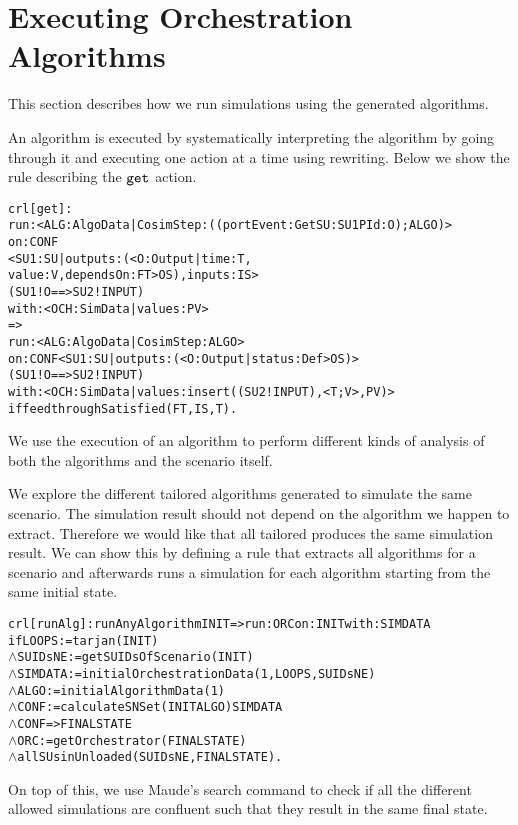 
\section{Executing Orchestration Algorithms}
This section describes how we run simulations using the generated algorithms.

An algorithm is executed by systematically interpreting the algorithm by going through it and executing one action at a time using rewriting.
Below we show the rule describing the $\mathtt{get}_{}$ action.
\begin{alltt}
\small
crl [get] : 
run: < ALG : AlgoData | CosimStep : ((portEvent: Get SU: SU1 PId: O) ; ALGO) >
on: CONF
    < SU1 : SU | outputs : (< O : Output | time : T, 
value : V, dependsOn : FT > OS), inputs : IS > 
    ( SU1 ! O ==> SU2 ! INPUT)
with: < OCH : SimData | values : PV >
=> 
run: < ALG : AlgoData | CosimStep : ALGO >
on: CONF < SU1 : SU | outputs : (< O : Output | status : Def > OS) > 
            ( SU1 ! O ==> SU2 ! INPUT)
with: < OCH : SimData | values : insert((SU2 ! INPUT), < T ; V >, PV) > 
if feedthroughSatisfied(FT, IS, T) .
\end{alltt}

We use the execution of an algorithm to perform different kinds of analysis of both the algorithms and the scenario itself.

We explore the different tailored algorithms generated to simulate the same scenario.
The simulation result should not depend on the algorithm we happen to extract. 
Therefore we would like that all tailored produces the same simulation result.
We can show this by defining a rule that extracts all algorithms for a scenario and afterwards runs a simulation for each algorithm starting from the same initial state.

\begin{alltt}
  \small
crl [runAlg] : runAnyAlgorithm INIT => run: ORC on: INIT with: SIMDATA
  if LOOPS := tarjan(INIT)
  \(\land\) SUIDsNE := getSUIDsOfScenario(INIT)
  \(\land\) SIMDATA := initialOrchestrationData(1,LOOPS,SUIDsNE)
  \(\land\) ALGO := initialAlgorithmData(1)
  \(\land\) CONF := calculateSNSet(INIT ALGO) SIMDATA 
  \(\land\) {CONF} => { FINALSTATE } 
  \(\land\) ORC := getOrchestrator(FINALSTATE)
  \(\land\) allSUsinUnloaded(SUIDsNE, FINALSTATE) .
\end{alltt}

On top of this, we use Maude's search command to check if all the different allowed simulations are confluent such that they result in the same final state.

